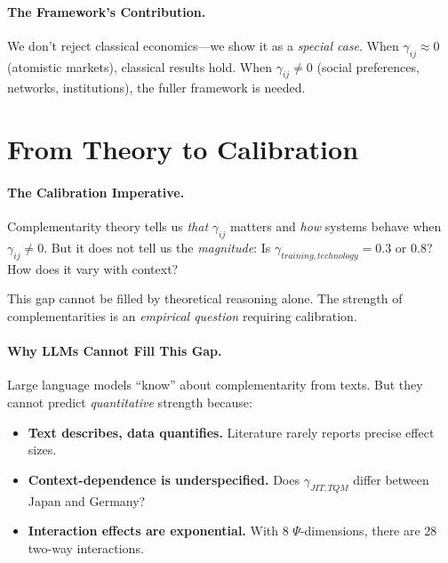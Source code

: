 \paragraph{The Framework's Contribution.}
We don't reject classical economics---we show it as a \emph{special case}.
When $\gamma_{ij} \approx 0$ (atomistic markets), classical results hold.
When $\gamma_{ij} \neq 0$ (social preferences, networks, institutions),
the fuller framework is needed.



\section{From Theory to Calibration}
\label{sec:comp-calibration}


\paragraph{The Calibration Imperative.}
Complementarity theory tells us \emph{that} $\gamma_{ij}$ matters and \emph{how} systems
behave when $\gamma_{ij} \neq 0$. But it does not tell us the \emph{magnitude}:
Is $\gamma_{training,technology} = 0.3$ or $0.8$? How does it vary with context?

This gap cannot be filled by theoretical reasoning alone. The strength of
complementarities is an \emph{empirical question} requiring calibration.

\paragraph{Why LLMs Cannot Fill This Gap.}
Large language models ``know'' about complementarity from texts.
But they cannot predict \emph{quantitative} strength because:
\begin{itemize}[nosep]
    \item \textbf{Text describes, data quantifies.} Literature rarely reports precise effect sizes.
    \item \textbf{Context-dependence is underspecified.} Does $\gamma_{JIT,TQM}$ differ between Japan and Germany?
    \item \textbf{Interaction effects are exponential.} With 8 $\Psi$-dimensions, there are 28 two-way interactions.
\end{itemize}

